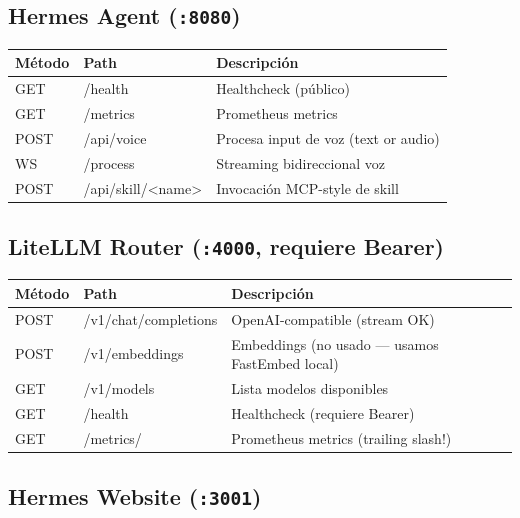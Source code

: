 \documentclass[11pt,a4paper]{article}
\begin{document}
\subsection{Hermes Agent (\texttt{:8080})}

\begin{center}
\begin{tabular}{|l|l|l|}
\hline
\rowcolor{hermesblue}\color{white}\textbf{Método} & \color{white}\textbf{Path} & \color{white}\textbf{Descripción}\\
\hline
GET & /health & Healthcheck (público)\\
GET & /metrics & Prometheus metrics\\
POST & /api/voice & Procesa input de voz (text or audio)\\
WS & /process & Streaming bidireccional voz\\
POST & /api/skill/<name> & Invocación MCP-style de skill\\
\hline
\end{tabular}
\end{center}

\subsection{LiteLLM Router (\texttt{:4000}, requiere Bearer)}

\begin{center}
\begin{tabular}{|l|l|l|}
\hline
\rowcolor{hermesblue}\color{white}\textbf{Método} & \color{white}\textbf{Path} & \color{white}\textbf{Descripción}\\
\hline
POST & /v1/chat/completions & OpenAI-compatible (stream OK)\\
POST & /v1/embeddings & Embeddings (no usado — usamos FastEmbed local)\\
GET & /v1/models & Lista modelos disponibles\\
GET & /health & Healthcheck (requiere Bearer)\\
GET & /metrics/ & Prometheus metrics (trailing slash!)\\
\hline
\end{tabular}
\end{center}

\subsection{Hermes Website (\texttt{:3001})}
\end{document}
